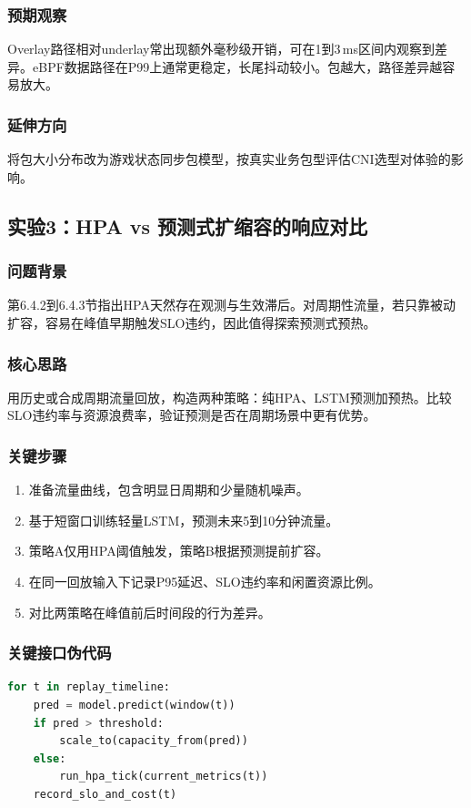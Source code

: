 \subsubsection{预期观察}
Overlay路径相对underlay常出现额外毫秒级开销，可在1到3\,ms区间内观察到差异。eBPF数据路径在P99上通常更稳定，长尾抖动较小。包越大，路径差异越容易放大。

\subsubsection{延伸方向}
将包大小分布改为游戏状态同步包模型，按真实业务包型评估CNI选型对体验的影响。

\subsection{实验3：HPA vs 预测式扩缩容的响应对比}

\subsubsection{问题背景}
第6.4.2到6.4.3节指出HPA天然存在观测与生效滞后。对周期性流量，若只靠被动扩容，容易在峰值早期触发SLO违约，因此值得探索预测式预热。

\subsubsection{核心思路}
用历史或合成周期流量回放，构造两种策略：纯HPA、LSTM预测加预热。比较SLO违约率与资源浪费率，验证预测是否在周期场景中更有优势。

\subsubsection{关键步骤}
\begin{enumerate}
\item 准备流量曲线，包含明显日周期和少量随机噪声。
\item 基于短窗口训练轻量LSTM，预测未来5到10分钟流量。
\item 策略A仅用HPA阈值触发，策略B根据预测提前扩容。
\item 在同一回放输入下记录P95延迟、SLO违约率和闲置资源比例。
\item 对比两策略在峰值前后时间段的行为差异。
\end{enumerate}

\subsubsection{关键接口伪代码}
\begin{tcolorbox}[title=预测式扩缩容回放框架]
\begin{lstlisting}[style=codeblock, language=python]
for t in replay_timeline:
    pred = model.predict(window(t))
    if pred > threshold:
        scale_to(capacity_from(pred))
    else:
        run_hpa_tick(current_metrics(t))
    record_slo_and_cost(t)
\end{lstlisting}
\end{tcolorbox}

